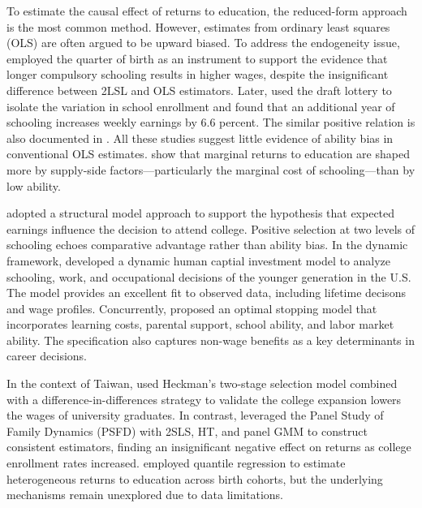 \documentclass[a4paper, 12pt]{article}
\begin{document}
To estimate the causal effect of returns to education, the reduced-form approach is the most common method. 
However, estimates from ordinary least squares (OLS) are often argued to be upward biased.
To address the endogeneity issue, \cite{angrist1991does} employed the quarter of birth as an instrument to support the evidence that longer compulsory schooling
results in higher wages, despite the insignificant difference between 2LSL and OLS estimators.
Later, \cite{angrist1992estimating} used the draft lottery to isolate the variation in school enrollment and found that
an additional year of schooling increases weekly earnings by 6.6 percent.
The similar positive relation is also documented in \cite{card1993using}.
All these studies suggest little evidence of ability bias in conventional OLS estimates.
\cite{card1999causal, card2001estimating} show that marginal returns to education are shaped more by supply-side factors---particularly the marginal cost of schooling---than by low ability.

\cite{willis1979education} adopted a structural model approach to support the hypothesis that expected earnings influence the decision to attend college.
Positive selection at two levels of schooling echoes comparative advantage rather than ability bias.
In the dynamic framework, \cite{keane1997career} developed a dynamic human captial investment model to analyze schooling, work, and occupational decisions of the younger generation in the U.S. 
The model provides an excellent fit to observed data, including lifetime decisons and wage profiles.
Concurrently, \cite{belzil1997estimating} proposed an optimal stopping model that incorporates learning costs, parental support, school ability, and labor market ability. 
The specification also captures non-wage benefits as a key determinants in career decisions.

In the context of Taiwan, \cite{Hsu2021HigherEd} used Heckman's two-stage selection model combined with a difference-in-differences strategy to validate the college expansion lowers the wages of university graduates.
In contrast, \cite{Li2009ReturnsEducationTaiwan} leveraged the Panel Study of Family Dynamics (PSFD) with 2SLS, HT, and panel GMM to construct consistent estimators, finding an insignificant negative effect on returns as college enrollment rates increased.
\cite{ChuangLai2011CohortEducation} employed quantile regression to estimate heterogeneous returns to education across birth cohorts,
but the underlying mechanisms remain unexplored due to data limitations.
\end{document}
